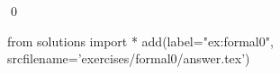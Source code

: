 
\begin{ex} 
  \label{ex:formal0}
  
  \qed
\end{ex} 
\begin{python0}
from solutions import *
add(label="ex:formal0",
    srcfilename='exercises/formal0/answer.tex') 
\end{python0}
